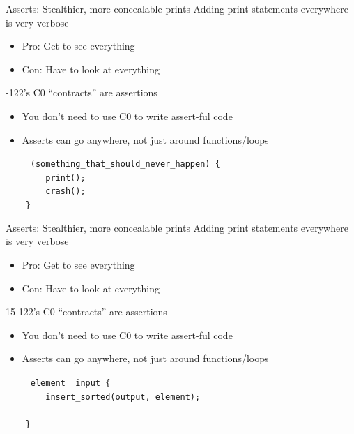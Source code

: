 \documentclass[xcolor=dvipsnames]{beamer}
\begin{document}
\begin{frame}{Asserts: Stealthier, more concealable prints}
	Adding print statements everywhere is very verbose
	\begin{itemize}
		\item Pro: Get to see everything
		\item Con: Have to look at everything
	\end{itemize}
	-122's C0 ``contracts'' are assertions
	\begin{itemize}
		\item You don't need to use C0 to write assert-ful code
		\item Asserts can go anywhere, not just around functions/loops
	\end{itemize}
	\pause
	\linegap

	\texttt{~~~~~(something\_that\_should\_never\_happen)~\{} \\
	\texttt{~~~~~~~~print();} \\
	\texttt{~~~~~~~~crash();} \\
	\texttt{~~~~\}} \\
\end{frame}
\begin{frame}{Asserts: Stealthier, more concealable prints}
	Adding print statements everywhere is very verbose
	\begin{itemize}
		\item Pro: Get to see everything
		\item Con: Have to look at everything
	\end{itemize}
	15-122's C0 ``contracts'' are assertions
	\begin{itemize}
		\item You don't need to use C0 to write assert-ful code
		\item Asserts can go anywhere, not just around functions/loops
	\end{itemize}
	\linegap

		\texttt{~~~~~element~~input~\{} \\
		\texttt{~~~~~~~~insert\_sorted(output,~element);} \\
		\texttt{~~~~~~~~} \\
		\texttt{~~~~\}} \\
\end{frame}
\end{document}
